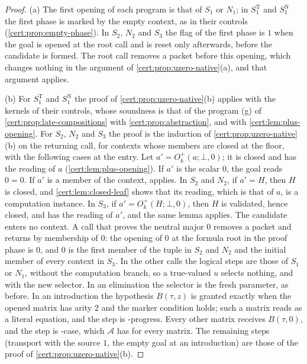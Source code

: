 \begin{proof}
(a) The first opening of each program is that of $S_1$ or $N_1$; in
$S^{\mathrm T}_1$ and $S^{\mathrm N}_1$ the first phase is marked by the empty
context, as in their controls (\cref{cert:prop:empty-phase}). In $S_2$, $N_2$ and
$S_3$ the flag of the first phase is $1$ when the goal is opened at the root
call and is reset only afterwards, before the candidate is formed. The root call
removes a packet before this opening, which changes nothing in the argument of
\cref{cert:prop:uzero-native}(a), and that argument applies.

(b) For $S^{\mathrm T}_1$ and $S^{\mathrm N}_1$ the proof of
\cref{cert:prop:uzero-native}(b) applies with the kernels of their controls,
whose soundness is that of the program (g) of \cref{cert:prop:late-compositions}
with \cref{cert:prop:abstraction}, and with \cref{cert:lem:plus-opening}. For
$S_2$, $N_2$ and $S_3$ the proof is the induction of
\cref{cert:prop:uzero-native}(b) on the returning call, for contexts whose
members are closed at the floor, with the following cases at the entry. Let
$a'=O^{+}_k(a;\bot,0)$; it is closed and has the reading of $a$
(\cref{cert:lem:plus-opening}). If $a'$ is the scalar $0$, the goal reads $0=0$.
If $a'$ is a member of the context,  applies. In $S_2$ and $N_2$,
if $a'=H$, then $H$ is closed, and \cref{cert:lem:closed-leaf} shows that its
reading, which is that of $a$, is a computation instance. In $S_3$, if
$a'=O^{+}_k(H;\bot,0)$, then $H$ is validated, hence closed, and has the reading
of $a'$, and the same lemma applies. The candidate enters no context. A call
that proves the neutral major $0$ removes a packet and returns by membership of
$0$: the opening of $0$ at the formula root in the proof phase is $0$, and $0$ is
the first member of the tuple in $S_2$ and $N_2$ and the initial member of every
context in $S_3$. In the other calls the logical steps are those of $S_1$ or
$N_1$, without the computation branch, so a true-valued $u$ selects nothing, and
with the new selector. In an elimination the selector is the fresh parameter, as
before. In an introduction the hypothesis $B(\tau,z)$ is granted exactly when
the opened matrix has arity $2$ and the marker condition holds; such a matrix
reads as a literal equation, and the step is -progress. Every
other matrix receives $B(\tau,0)$, and the step is -case, which
$\mathcal A$ has for every matrix. The remaining steps (transport with the source
$1$, the empty goal at an introduction) are those of the proof of
\cref{cert:prop:uzero-native}(b).


\end{proof}
